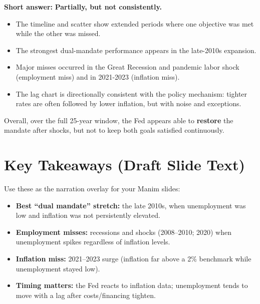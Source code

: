 \documentclass[
  11pt,
]{article}
\providecommand{\tightlist}{%
  \setlength{\itemsep}{0pt}\setlength{\parskip}{0pt}}
\begin{document}
\textbf{Short answer:} \textbf{Partially, but not consistently.}

\begin{itemize}
\tightlist
\item
  The timeline and scatter show extended periods where one objective was
  met while the other was missed.\\
\item
  The strongest dual-mandate performance appears in the late-2010s
  expansion.\\
\item
  Major misses occurred in the Great Recession and pandemic labor shock
  (employment miss) and in 2021-2023 (inflation miss).\\
\item
  The lag chart is directionally consistent with the policy mechanism:
  tighter rates are often followed by lower inflation, but with noise
  and exceptions.
\end{itemize}

Overall, over the full 25-year window, the Fed appears able to
\textbf{restore} the mandate after shocks, but not to keep both goals
satisfied continuously.

\section{Key Takeaways (Draft Slide
Text)}\label{key-takeaways-draft-slide-text}

Use these as the narration overlay for your Manim slides:

\begin{itemize}
\tightlist
\item
  \textbf{Best ``dual mandate'' stretch:} the late 2010s, when
  unemployment was low and inflation was not persistently elevated.\\
\item
  \textbf{Employment misses:} recessions and shocks (2008--2010; 2020)
  when unemployment spikes regardless of inflation levels.\\
\item
  \textbf{Inflation miss:} 2021--2023 surge (inflation far above a 2\%
  benchmark while unemployment stayed low).\\
\item
  \textbf{Timing matters:} the Fed reacts to inflation data;
  unemployment tends to move with a lag after costs/financing tighten.
\end{itemize}
\end{document}
